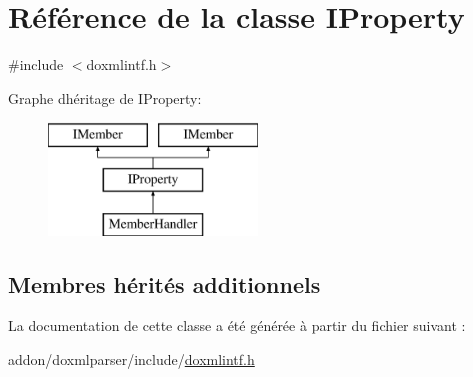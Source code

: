 \hypertarget{class_i_property}{}\section{Référence de la classe I\+Property}
\label{class_i_property}


{\ttfamily \#include $<$doxmlintf.\+h$>$}

Graphe d\textquotesingle{}héritage de I\+Property\+:\begin{figure}[H]
\begin{center}
\leavevmode
\includegraphics[height=3.000000cm]{class_i_property}
\end{center}
\end{figure}
\subsection*{Membres hérités additionnels}


La documentation de cette classe a été générée à partir du fichier suivant \+:\begin{DoxyCompactItemize}
\item 
addon/doxmlparser/include/\hyperlink{include_2doxmlintf_8h}{doxmlintf.\+h}\end{DoxyCompactItemize}

